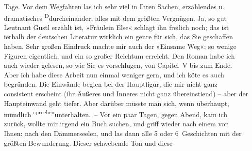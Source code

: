 \begin{ledgroupsized}[t]{13cm}
               Tage.\pend
           \pstart
           Vor dem Wegfahren las ich sehr viel in Ihren Sachen, erzählendes u. dramatisches \substVorne{}\textsuperscript{D}\substDazwischen{}d\substHinten{}urcheinander, alles mit dem größten Vergnügen. Ja, so gut Leutnant Gustl erzählt ist, »Fräulein Else« schlägt ihn freilich noch; das ist i{\geminationn}erhalb der deutschen Literatur wirklich ein genre für
               sich, das Sie geschaffen haben. Sehr großen Eindruck machte mir auch der »Einsame Weg«; so wenige Figuren eigentlich, und
               ein so großer Reichtum erreicht. Den Roman habe ich {\pb}auch wieder gelesen, so wie Sie es
               vorschlugen, von Capitel V bis zum Ende. Aber ich habe diese Arbeit nun einmal
               weniger gern, und ich kö{\geminationn}te es auch begründen. Die
               Einwände begi{\geminationn}en bei der Hauptfigur, die mir nicht ganz
               consistent erscheint (ihr Äußeres und Inneres nicht ganz übereinsti{\geminationm}end) – aber der Haupteinwand geht tiefer. Aber darüber
               müsste man sich, wenn überhaupt, mündlich \substVorne{}\textsuperscript{sprechen}{\allowbreak}\substDazwischen{}unterhalten\substHinten{}. – Vor ein paar Tagen, gegen Abend, kam ich zurück, wollte \introOben{}mir\introOben{} irgend ein Buch suchen, und griff wieder nach einem von
               Ihnen: nach den Dämmerseelen, und las dann alle
               5 oder 6 Geschichten mit der größten Bewunderung. Dieser schwebende Ton und diese

\end{ledgroupsized}
